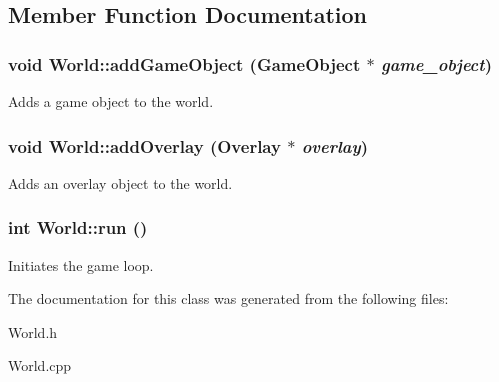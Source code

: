 \subsection{Member Function Documentation}
\hypertarget{classWorld_ad74a2b078f0173249b04e3da2982d081}{
\subsubsection[{addGameObject}]{\setlength{\rightskip}{0pt plus 5cm}void World::addGameObject ({\bf GameObject} $\ast$ {\em game\_\-object})}}
\label{classWorld_ad74a2b078f0173249b04e3da2982d081}
Adds a game object to the world. \hypertarget{classWorld_a6703e4f889e72198e0ede0cd23864792}{
\subsubsection[{addOverlay}]{\setlength{\rightskip}{0pt plus 5cm}void World::addOverlay ({\bf Overlay} $\ast$ {\em overlay})}}
\label{classWorld_a6703e4f889e72198e0ede0cd23864792}
Adds an overlay object to the world. \hypertarget{classWorld_a0e3eea96c33cd34c6a3b05bba6b88ef5}{
\subsubsection[{run}]{\setlength{\rightskip}{0pt plus 5cm}int World::run ()}}
\label{classWorld_a0e3eea96c33cd34c6a3b05bba6b88ef5}
Initiates the game loop. 

The documentation for this class was generated from the following files:\begin{DoxyCompactItemize}
\item 
World.h\item 
World.cpp\end{DoxyCompactItemize}
